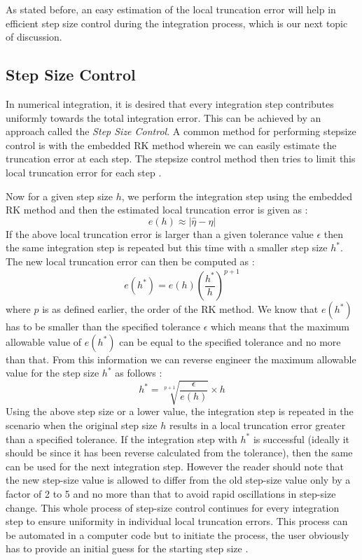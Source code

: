 As stated before, an easy estimation of the local truncation error will help in efficient step size control during the integration process, which is our next topic of discussion.

\subsection{Step Size Control}
In numerical integration, it is desired that every integration step contributes uniformly towards the total integration error. This can be achieved by an approach called the \textit{Step Size Control}. A common method for performing stepsize control is with the embedded \gls{RK} method wherein we can easily estimate the truncation error at each step. The stepsize control method then tries to limit this local truncation error for each step \cite{gillbook}.

Now for a given step size $h$, we perform the integration step using the embedded \gls{RK} method and then the estimated local truncation error is given as \cite{gillbook}:
\begin{equation}
e(h) \approx |\hat{\eta} - \eta|
\end{equation}
%
If the above local truncation error is larger than a given tolerance value $\epsilon$ then the same integration step is repeated but this time with a smaller step size $h^*$. The new local truncation error can then be computed as \cite{gillbook}:
\begin{equation}
e(h^*) = e(h)\left( \frac{h^*}{h} \right)^{p+1}
\end{equation}
%
where $p$ is as defined earlier, the order of the \gls{RK} method. We know that $e(h^*)$ has to be smaller than the specified tolerance $\epsilon$ which means that the maximum allowable value of $e(h^*)$ can be equal to the specified tolerance and no more than that. From this information we can reverse engineer the maximum allowable value for the step size $h^*$ as follows \cite{gillbook}:
\begin{equation}
h^* = \sqrt[p+1]{\frac{\epsilon}{e(h)}} \times h
\end{equation}
%
Using the above step size or a lower value, the integration step is repeated in the scenario when the original step size $h$ results in a local truncation error greater than a specified tolerance. If the integration step with $h^*$ is successful (ideally it should be since it has been reverse calculated from the tolerance), then the same can be used for the next integration step. However the reader should note that the new step-size value is allowed to differ from the old step-size value only by a factor of 2 to 5 and no more than that to avoid rapid oscillations in step-size change. This whole process of step-size control continues for every integration step to ensure uniformity in individual local truncation errors. This process can be automated in a computer code but to initiate the process, the user obviously has to provide an initial guess for the starting step size \cite{gillbook}.


